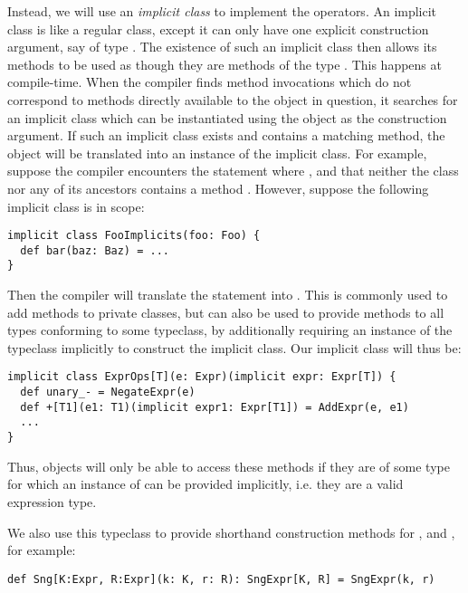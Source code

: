Instead, we will use an \textit{implicit class} to implement the operators. An implicit class is like a regular class, except it can only have one explicit construction argument, say of type . The existence of such an implicit class then allows its methods to be used as though they are methods of the type . This happens at compile-time. When the compiler finds method invocations which do not correspond to methods directly available to the object in question, it searches for an implicit class which can be instantiated using the object as the construction argument. If such an implicit class exists and contains a matching method, the object will be translated into an instance of the implicit class.
For example, suppose the compiler encounters the statement  where , and that neither the class  nor any of its ancestors contains a method . However, suppose the following implicit class is in scope:
\vs\begin{lstlisting}
implicit class FooImplicits(foo: Foo) {
  def bar(baz: Baz) = ...
}
\end{lstlisting}\vs
Then the compiler will translate the statement  into . This is commonly used to add methods to private classes, but can also be used to provide methods to all types conforming to some typeclass, by additionally requiring an instance of the typeclass implicitly to construct the implicit class. Our implicit class will thus be:
\vs \begin{lstlisting}
implicit class ExprOps[T](e: Expr)(implicit expr: Expr[T]) {
  def unary_- = NegateExpr(e)
  def +[T1](e1: T1)(implicit expr1: Expr[T1]) = AddExpr(e, e1)
  ...
}
\end{lstlisting} \vs
Thus, objects will only be able to access these methods if they are of some type  for which an instance of  can be provided implicitly, i.e. they are a valid expression type.

We also use this typeclass to provide shorthand construction methods for ,  and , for example:
\begin{lstlisting}
def Sng[K:Expr, R:Expr](k: K, r: R): SngExpr[K, R] = SngExpr(k, r)
\end{lstlisting}


